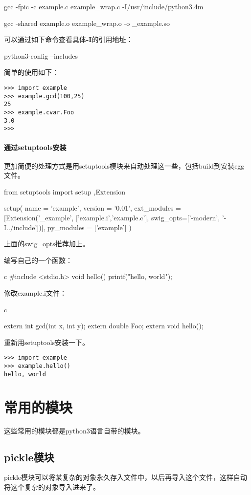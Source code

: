 \documentclass[12pt,oneside]{book}
\begin{document}
\begin{common-format}
\begin{tcbbash}[]
gcc -fpic -c example.c example_wrap.c -I/usr/include/python3.4m

gcc -shared example.o example_wrap.o -o _example.so
\end{tcbbash}

可以通过如下命令查看具体\textbf{-I}的引用地址：
\begin{tcbbash}[]
python3-config --includes
\end{tcbbash}

简单的使用如下：
\begin{Verbatim}
>>> import example
>>> example.gcd(100,25)
25
>>> example.cvar.Foo
3.0
>>> 
\end{Verbatim}

\subsection{通过setuptools安装}
更加简便的处理方式是用setuptools模块来自动处理这一些，包括build到安装egg文件。
\begin{tcbpython}[]
from setuptools import setup ,Extension

setup(
    name = 'example',
    version = '0.01',
    ext_modules = [Extension('_example', ['example.i','example.c'],
    swig_opts=['-modern', '-I../include'])],
    py_modules = ['example']
)
\end{tcbpython}
上面的swig\_{}opts推荐加上。

编写自己的一个函数：
\begin{tcbcode}{c}
#include <stdio.h>
void hello(){
    printf("hello, world\n");
}
\end{tcbcode}

修改example.i文件：
\begin{tcbcode}{c}

extern int    gcd(int x, int y);
extern double Foo;
extern void hello();
\end{tcbcode}

重新用setuptools安装一下。
\begin{Verbatim}
>>> import example
>>> example.hello()
hello, world
\end{Verbatim}





\part{常用的模块}
这些常用的模块都是python3语言自带的模块。

\chapter{pickle模块}
\label{sec:pickle模块}
pickle模块可以将某复杂的对象永久存入文件中，以后再导入这个文件，这样自动将这个复杂的对象导入进来了。


\end{common-format}
\end{document}
